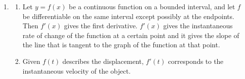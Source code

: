 \documentclass[a4paper, 12pt]{article}
\renewcommand{\headrulewidth}{0pt}
\renewcommand{\headrulewidth}{0pt}
\begin{document}
\begin{enumerate}[leftmargin=*,label=\textbf{\arabic*.}]
\begin{enumerate}[leftmargin=*,label=\textbf{\alph*.}]
$ e^{x^2}$ grows at a higher rate than $x$. Therefore, $f$ is decreasing. The expressions are continuous for $x>1$. We may now apply the Integral Test. Handle the improper integral with the limit.
\[\int_1^\infty\frac x{ e^{x^2}}\,dx=\lim_{R\to\infty}-\frac12 e^{-x^2}\bigg|_1^R=\lim_{R\to\infty}-\frac12\left( e^{-R^2}- e^{-1}\right)=\frac1{2 e}\quad\left(\text{converges}\right)\]

By the Integral Test, the series $\boxed{\text{converges}}$.
\end{enumerate}

\item \begin{enumerate}[leftmargin=*,label=\textbf{\alph*.}]
\item Let $y=f(x)$ be a continuous function on a bounded interval, and let $f$ be differentiable on the same interval except possibly at the endpoints. Then $f'(x)$ gives the first derivative. $f'(x)$ gives the instantaneous rate of change of the function at a certain point and it gives the slope of the line that is tangent to the graph of the function at that point.

\item Given $f(t)$ describes the displacement, $f'(t)$ corresponds to the instantaneous velocity of the object.
\end{enumerate}
\end{enumerate}

\newpage
{}
{}

\newpage
\pagestyle{fancy}
\renewcommand{\headrulewidth}{1pt}

\end{document}
